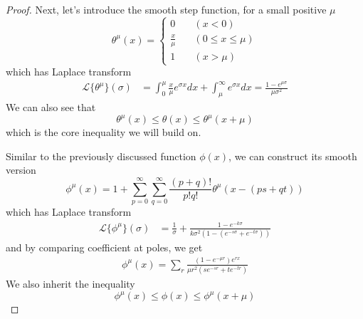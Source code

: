 \documentclass[]{article}
\begin{document}
\begin{proof}
Next, let's introduce the smooth step function, for a small positive $\mu$
\[
\theta^{\mu}(x) = \begin{cases}
0 \quad &(x < 0) \\
\frac{x}{\mu} \quad &(0\le x\le \mu)\\
1 \quad &(x>\mu)
\end{cases}
\]
which has Laplace transform
\begin{align*}
\mathcal{L}\{\theta^{\mu}\}(\sigma) &= \int_0^{\mu} \frac{x}{\mu} e^{\sigma x} dx + \int_{\mu}^\infty e^{\sigma x} dx = \frac{1 - e^{\mu\sigma}}{\mu\sigma^2}
\end{align*}
We can also see that
\[
	\theta^{\mu}(x)\le\theta(x)\le\theta^{\mu}(x+\mu)
\]
which is the core inequality we will build on.

Similar to the previously discussed function $\phi(x)$, we can construct its smooth version
\[
\phi^{\mu}(x) = 1 + \sum_{p=0}^{\infty}\sum_{q=0}^{\infty}\frac{(p+q)!}{p!q!}\theta^{\mu}(x-(ps+qt))
\]
which has Laplace transform
\begin{align*}
\mathcal{L}\{\phi^{\mu}\}(\sigma) &= \frac{1}{\sigma} + \frac{1-e^{-k\sigma}}{k\sigma^2(1-(e^{-s\sigma} + e^{-t\sigma}))}
\end{align*}
and by comparing coefficient at poles, we get
\begin{align*}
\phi^{\mu}(x) = \sum_{r} \frac{(1-e^{-\mu r})e^{rx}}{\mu r^2(se^{-sr}+te^{-tr})}
\end{align*}
We also inherit the inequality
\[
\phi^{\mu}(x)\le\phi(x)\le\phi^{\mu}(x+\mu)
\]


\end{proof}
\end{document}
